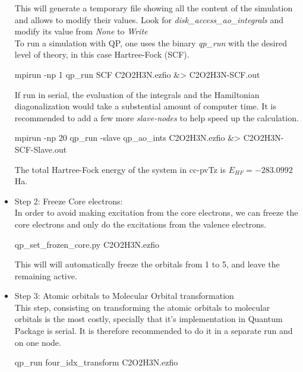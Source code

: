 \begin{itemize}
This will generate a temporary file showing all the content of the simulation and allows to modify their values. Look for \textit{disk\_access\_ao\_integrals} and modify its value from \textit{None} to \textit{Write}\\

To run a simulation with QP, one uses the binary \textit{qp\_run} with the desired level of theory, in this case Hartree-Fock (SCF). \\
\begin{shade}
mpirun -np 1 qp_run SCF C2O2H3N.ezfio &> C2O2H3N-SCF.out 
\end{shade}

If run in serial, the evaluation of the integrals and the Hamiltonian diagonalization would take a substential amount of computer time. It is recommended to add a few more \textit{slave-nodes} to help speed up the calculation.\\

\begin{shade}
mpirun -np 20 qp_run -slave qp_ao_ints C2O2H3N.ezfio &> C2O2H3N-SCF-Slave.out 
\end{shade}
The total Hartree-Fock energy of the system in cc-pvTz is \textit{$E_{HF}=-283.0992$}Ha.\\ 
\item Step 2: Freeze Core electrons:\\
In order to avoid making excitation from the core electrons, we can freeze the core electrons and only do the excitations from the valence electrons.\\  
\begin{shade}
qp_set_frozen_core.py C2O2H3N.ezfio
\end{shade}
This will will automatically freeze the orbitals from 1 to 5, and leave the remaining active. \\
\item Step 3: Atomic orbitals to Molecular Orbital transformation\\
This step, consisting on transforming the atomic orbitals to molecular orbitals is the most costly, specially that it's implementation in Quantum Package is serial. It is therefore recommended to do it in a separate run and on one node.\\
\begin{shade}
qp_run four_idx_transform C2O2H3N.ezfio
\end{shade}


\end{itemize}
